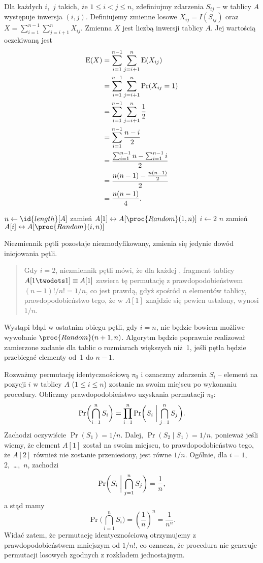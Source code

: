 \exercise{} %
\noindent Dla każdych $i$,~$j$ takich, że $1\le i<j\le n$, zdefiniujmy zdarzenia $S_{ij}$ -- w tablicy $A$ występuje inwersja $(i,j)$. Definiujemy zmienne losowe $X_{ij}=I(S_{ij})$ oraz $X=\sum_{i=1}^{n-1}\sum_{j=i+1}^nX_{ij}$. Zmienna $X$ jest liczbą inwersji tablicy $A$. Jej wartością oczekiwaną jest
\begin{align*}
	\operatorname{E}(X) &= \sum_{i=1}^{n-1}\sum_{j=i+1}^n\operatorname{E}(X_{ij}) \\
	&= \sum_{i=1}^{n-1}\sum_{j=i+1}^n\Pr(X_{ij}=1) \\
	&= \sum_{i=1}^{n-1}\sum_{j=i+1}^n\frac{1}{2} \\
	&= \sum_{i=1}^{n-1}\frac{n-i}{2} \\
	&= \frac{\sum_{i=1}^{n-1}n-\sum_{i=1}^{n-1}i}{2} \\
	&= \frac{n(n-1)-\frac{n(n-1)}{2}}{2} \\
	&= \frac{n(n-1)}{4}.
\end{align*}


\exercise{} %
\begin{codebox}
\li	$n\gets\id{length}[A]$
\li	zamień $A[1]\leftrightarrow A[\proc{Random}(1,n)]$
\li	\For $i\gets2$ \To $n$
\li		\Do
			zamień $A[i]\leftrightarrow A[\proc{Random}(i,n)]$
		\End
\end{codebox}
Niezmiennik pętli pozostaje niezmodyfikowany, zmienia się jedynie dowód inicjowania pętli.
\begin{quote}
	Gdy $i=2$, niezmiennik pętli mówi, że dla każdej , fragment tablicy $A[1\twodots1]\equiv A[1]$ zawiera tę permutację z prawdopodobieństwem $(n-1)!/n!=1/n$, co jest prawdą, gdyż spośród $n$ elementów tablicy, prawdopodobieństwo tego, że w $A[1]$ znajdzie się pewien ustalony, wynosi $1/n$.
\end{quote}

\exercise{} %
\noindent Wystąpi błąd w ostatnim obiegu pętli, gdy $i=n$, nie będzie bowiem możliwe wywołanie $\proc{Random}(n+1,n)$. Algorytm będzie poprawnie realizował zamierzone zadanie dla tablic o rozmiarach większych niż~1, jeśli pętla będzie przebiegać elementy od~1 do $n-1$.

\exercise{} %
\noindent Rozważmy permutację identycznościową $\pi_0$ i oznaczmy zdarzenia $S_i$ -- element na pozycji $i$ w tablicy $A$ ($1\le i\le n$) zostanie na swoim miejscu po wykonaniu procedury. Obliczmy prawdopodobieństwo uzyskania permutacji $\pi_0$:
\[
	\Pr\biggl(\bigcap_{i=1}^nS_i\biggr) = \prod_{i=1}^n\Pr\biggl(S_i\biggm|\bigcap_{j=1}^nS_j\biggr).
\]
Zachodzi oczywiście $\Pr(S_1)=1/n$. Dalej, $\Pr(S_2\mid S_1)=1/n$, ponieważ jeśli wiemy, że element $A[1]$ został na swoim miejscu, to prawdopodobieństwo tego, że $A[2]$ również nie zostanie przeniesiony, jest równe $1/n$. Ogólnie, dla $i=1$, 2,~\dots,~$n$, zachodzi
\[
	\Pr\biggl(S_i\biggm|\bigcap_{j=1}^nS_j\biggr) = \frac{1}{n},
\]
a stąd mamy
\[
	\Pr\biggl(\bigcap_{i=1}^nS_i\biggr) = \left(\frac{1}{n}\right)^n = \frac{1}{n^n}.
\]
Widać zatem, że permutację identycznościową otrzymujemy z prawdopodobieństwem mniejszym od $1/n!$, co oznacza, że procedura  nie generuje permutacji losowych zgodnych z rozkładem jednostajnym.

